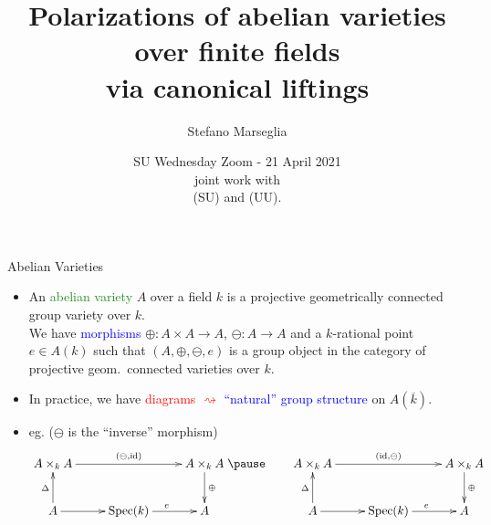\documentclass[usenames,dvipsnames,handout]{beamer}
\title[]{Polarizations of abelian varieties over finite fields\\ via canonical liftings}
\subtitle{}
\author[Stefano Marseglia]{Stefano Marseglia\\}
\institute[]{Utrecht University}
\date[21 April 2021]{SU Wednesday Zoom - 21 April 2021\\ \pause joint work with\\ \red{Jonas Bergstr\"om} (SU) and \red{Valentijn Karemaker} (UU).}
\def\C{\mathbb{C}}
\def\F{\mathbb{F}}
\newcommand{\red}[1]{\textcolor{red}{#1}}
\newcommand{\blue}[1]{\textcolor{blue}{#1}}
\newcommand{\green}[1]{\textcolor{ForestGreen}{#1}}
\begin{document}

\begin{frame}
\titlepage
\end{frame}


\begin{frame}{ Abelian Varieties }
	\begin{itemize}
	 \item An \green{abelian variety} $A$ over a field $k$ is a projective geometrically connected group variety over $k$.\\
	 \pause We have \blue{morphisms} $\oplus:A\times A \to A$, $\ominus:A\to A$ and a $k$-rational point $e\in A(k)$ such that $(A,\oplus,\ominus,e)$ is a group object in the category of projective geom.~connected varieties over $k$.
	 \pause \item In practice, we have \red{diagrams $\rightsquigarrow$} \blue{``natural'' group structure} on $A(\overline k)$.
	 \pause \item eg. ($\ominus$ is the ``inverse'' morphism)
	 {\tiny
	 \[ 
	 	\xymatrix{
	 		A\times_k A \ar[rr]^{(\ominus,\mathrm{id})} 	& 						& A\times_k A \ar[d]^{\oplus}\\
	 		A \ar[u]^{\Delta} \ar[r] 	& \mathrm{Spec}(k) \ar[r]^{e}	& A 
	 	}
	 	\pause \qquad
	 	\xymatrix{
	 		A\times_k A \ar[rr]^{(\mathrm{id},\ominus)} 	& 						& A\times_k A \ar[d]^{\oplus}\\
	 		A \ar[u]^{\Delta} \ar[r] 	& \mathrm{Spec}(k) \ar[r]^{e}	& A 
	 	}
	  \]}
	\end{itemize}
\end{frame}
\end{document}
